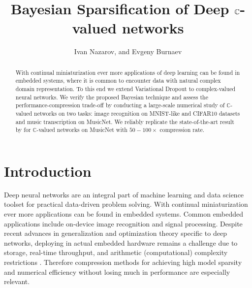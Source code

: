 \documentclass[a4paper,10pt]{article}
\title{Bayesian Sparsification of Deep $\cplx$-valued networks}
\author{Ivan Nazarov, and Evgeny Burnaev}
\newcommand{\cplx}{\mathbb{C}}
\begin{document}
\maketitle

\begin{abstract}
With continual miniaturization ever more applications of deep learning can be found
in embedded systems, where it is common to encounter data with natural complex domain
representation. To this end we extend Variational Dropout to complex-valued neural
networks. We verify the proposed Bayesian technique and assess the performance-compression
trade-off by conducting a large-scale numerical study of $\cplx$-valued networks on
two tasks: image recognition on MNIST-like and CIFAR10 datasets and music transcription
on MusicNet. We reliably replicate the state-of-the-art result by \citet{trabelsi_deep_2017}
for $\cplx$-valued networks on MusicNet with $50-100\times$ compression rate.
\end{abstract}

\section{Introduction} %
\label{sec:introduction}

Deep neural networks are an integral part of machine learning and data science toolset
for practical data-driven problem solving. With continual miniaturization ever more
applications can be found in embedded systems. Common embedded applications include
on-device image recognition and signal processing. Despite recent advances in generalization
and optimization theory specific to deep networks, deploying in actual embedded hardware
remains a challenge due to storage, real-time throughput, and arithmetic (computational)
complexity restrictions \citep{he_amc:_2018}. Therefore compression methods for achieving
high model sparsity and numerical efficiency without losing much in performance are
especially relevant.
\end{document}
